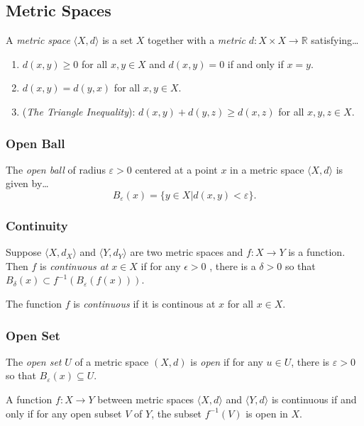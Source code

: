 \subsection{Metric Spaces}\label{metricspace}

A \emph{metric space} $\langle X,d \rangle$ is a set $X$ together with a \emph{metric}\label{metric} $d : X \times X \rightarrow \mathbb{R}$ satisfying\dots
\begin{enumerate}
  \item $d(x,y) \geq 0$ for all $x,y \in X$ and $d(x,y) = 0$ if and only if $x = y$.
  \item $d(x,y) = d(y,x)$ for all $x,y \in X$.
  \item (\emph{The Triangle Inequality}\label{triangleinequality}): $d(x,y) + d(y,z) \geq d(x,z)$ for all $x,y,z \in X.$
\end{enumerate}

\subsubsection{Open Ball}\label{metricopenball}
The \emph{open ball} of radius $\varepsilon > 0$ centered at a point $x$ in a metric space $\langle X,d \rangle$ is given by\dots
$$B_{\varepsilon}(x) = \{ y \in X | d(x,y) < \varepsilon\}.$$

\subsubsection{Continuity}\label{metriccontinuity}
Suppose $\langle X,d_X \rangle$ and $\langle Y,d_Y \rangle$ are two metric spaces and $f: X \rightarrow Y$ is a function. Then $f$ is \emph{continuous at} $x\in X$ if for any $\epsilon > 0$ , there is a $\delta > 0$
so that $B_{\delta}(x) \subset f^{-1}(B_{\varepsilon}(f(x)))$.\newline

\noindent The function $f$ is \emph{continuous} if it is continous at $x$ for all $x \in X$.

\subsubsection{Open Set}\label{metricopenset}
The \emph{open set} $U$ of a metric space $(X,d)$ is \emph{open} if for any $u \in U$, there is $\varepsilon > 0$ so that $B_{\varepsilon}(x) \subseteq U$.

\begin{theorem}
A function $f:X \rightarrow Y$ between metric spaces $\langle X,d \rangle$ and $\langle Y,d \rangle$ is continuous if and only if for any open subset $V$ of $Y$, the subset $f^{-1}(V)$ is open in $X$.
\end{theorem}

